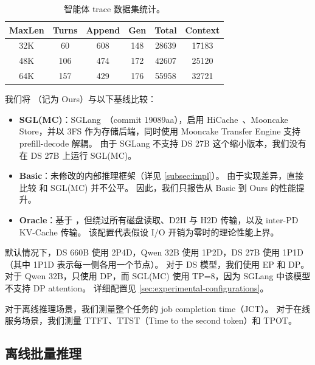 \begin{table}[t!]
\centering
\caption{\normalfont 智能体 trace 数据集统计。}
\begin{tabular}{cccccc}
\toprule
\textbf{MaxLen} & \textbf{Turns} & \textbf{Append} & \textbf{Gen} & \textbf{Total} & \textbf{Context} \\
\midrule
32K  &  60 & 608  & 148 & 28639 & 17183 \\
48K  & 106 & 474  & 172 & 42607 & 25120 \\
64K  & 157 & 429  & 176 & 55958 & 32721 \\
\bottomrule
\end{tabular}
\label{tab:agent-dataset-statistics}
\end{table}


我们将 \sysname（记为 Ours）与以下基线比较：

\begin{itemize}[leftmargin=*]
\item \textbf{SGL(MC)}：SGLang~\cite{NIPS24:SGLang}（commit 19089aa），启用 HiCache~\cite{Hicache}、Mooncake~\cite{FAST25:Mooncake} Store，并以 3FS 作为存储后端，同时使用 Mooncake Transfer Engine 支持 prefill-decode 解耦。
由于 SGLang 不支持 DS 27B 这个缩小版本，我们没有在 DS 27B 上运行 SGL(MC)。
\item \textbf{Basic}：未修改的内部推理框架（详见 \autoref{subsec:impl}）。
由于实现差异，直接比较 \sysname 和 SGL(MC) 并不公平。
因此，我们只报告从 Basic 到 Ours 的性能提升。
\item \textbf{Oracle}：基于 \sysname，但绕过所有磁盘读取、D2H 与 H2D 传输，以及 inter-PD KV-Cache 传输。
该配置代表假设 I/O 开销为零时的理论性能上界。
\end{itemize}

默认情况下，DS 660B 使用 2P4D，Qwen 32B 使用 1P2D，DS 27B 使用 1P1D（其中 1P1D 表示每一侧各用一个节点）。
对于 DS 模型，我们使用 EP 和 DP。
对于 Qwen 32B，\sysname 只使用 DP，而 SGL(MC) 使用 TP=8，因为 SGLang 中该模型不支持 DP attention。
详细配置见 \autoref{sec:experimental-configurations}。

 对于离线推理场景，我们测量整个任务的 job completion time（JCT）。
对于在线服务场景，我们测量 TTFT、TTST（Time to the second token）和 TPOT。


\subsection{离线批量推理}
\label{subsec:offline-batch-infer}




